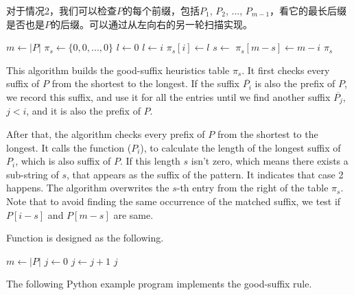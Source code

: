 \documentclass[UTF8]{article}
\begin{document}
对于情况2，我们可以检查$P$的每个前缀，包括$P_1$, $P_2$, ..., $P_{m-1}$，看它的最长后缀是否也是$P$的后缀。可以通过从左向右的另一轮扫描实现。

\begin{algorithmic}[1]
  \State $m \gets |P|$
  \State $\pi_s \gets \{0, 0, ..., 0\}$ 
  \State $l \gets 0$ 
   
     
      \State $l \gets i$
    \EndIf
    \State $\pi_s[i] \gets l$
  \EndFor
   
    \State $s \gets$ 
      \State $\pi_s[m - s] \gets m - i$
    \EndIf
  \EndFor
  \State \Return $\pi_s$
\EndFunction
\end{algorithmic}

This algorithm builds the good-suffix heuristics table $\pi_s$. It first checks every
suffix of $P$ from the shortest to the longest. If the suffix $\overline{P_i}$ is also the prefix of $P$, we record
this suffix, and use it for all the entries until we find another suffix $\overline{P_j}$, $j < i$, and it is also the prefix of $P$.

After that, the algorithm checks every prefix of $P$ from the shortest to the longest. It calls
the function ($P_i$), to calculate the length of the longest suffix
of $P_i$, which is also suffix of $P$. If this length $s$ isn't zero, which means there
exists a sub-string of $s$, that appears as the suffix of the pattern. It indicates that
case 2 happens. The algorithm overwrites the $s$-th entry from the right
of the table $\pi_s$. Note that to avoid finding the same occurrence of the matched suffix,
we test if $P[i - s]$ and $P[m - s]$ are same.

Function  is designed as the following.

\begin{algorithmic}[1]
  \State $m \gets |P|$
  \State $j \gets 0$
    \State $j \gets j + 1$
  \EndWhile
  \State \Return $j$
\EndFunction
\end{algorithmic}

The following Python example program implements the good-suffix rule.
\end{document}
